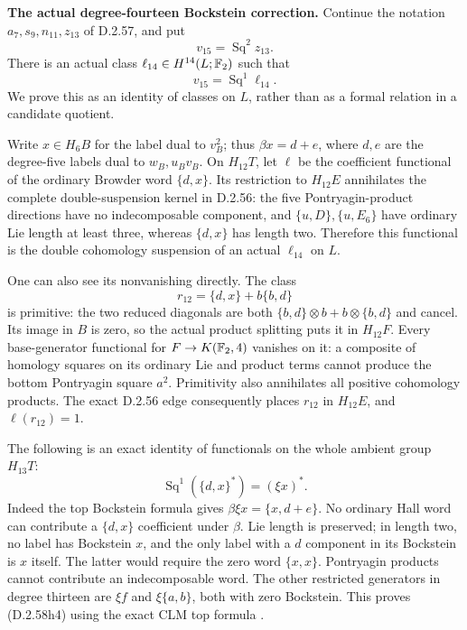 \textbf{The actual degree-fourteen Bockstein correction.}
Continue the notation $a_7,s_9,n_{11},z_{13}$ of D.2.57, and put
\[
 v_{15}=\operatorname{Sq}^2z_{13}.
 \tag{D.2.58h1}
\]
There is an actual class $\ell_{14}\in H^{14}(L;\mathbb F_2)$ such that
\[
             v_{15}=\operatorname{Sq}^1\ell_{14}.
 \tag{D.2.58h2}
\]
We prove this as an identity of classes on $L$, rather than as a
formal relation in a candidate quotient.

Write $x\in H_6B$ for the label dual to $v_B^2$; thus
$\beta x=d+e$, where $d,e$ are the degree-five labels dual to
$w_B,u_Bv_B$. On $H_{12}T$, let $\ell$ be the coefficient functional
of the ordinary Browder word $\{d,x\}$. Its restriction to $H_{12}E$
annihilates the complete double-suspension kernel in D.2.56:
the five Pontryagin-product directions have no indecomposable
component, and $\{u,D\},\{u,E_6\}$ have ordinary Lie length at
least three, whereas $\{d,x\}$ has length two. Therefore this
functional is the double cohomology suspension of an actual
$\ell_{14}$ on $L$.

One can also see its nonvanishing directly. The class
\[
             r_{12}=\{d,x\}+b\{b,d\}
             \tag{D.2.58h3}
\]
is primitive: the two reduced diagonals are both
$\{b,d\}\otimes b+b\otimes\{b,d\}$ and cancel.
Its image in $B$ is zero, so the actual product splitting puts it
in $H_{12}F$. Every base-generator functional for
$F\to K(\mathbb F_2,4)$ vanishes on it: a composite of homology squares
on its ordinary Lie and product terms cannot produce the bottom
Pontryagin square $a^2$. Primitivity also annihilates all positive
cohomology products. The exact D.2.56 edge consequently places
$r_{12}$ in $H_{12}E$, and $\ell(r_{12})=1$.

The following is an exact identity of functionals on the whole
ambient group $H_{13}T$:
\[
       \operatorname{Sq}^1(\{d,x\}^{*})=(\xi x)^{*}.
       \tag{D.2.58h4}
\]
Indeed the top Bockstein formula gives
$\beta\xi x=\{x,d+e\}$. No ordinary Hall word can contribute a
$\{d,x\}$ coefficient under $\beta$. Lie length is preserved;
in length two, no label has Bockstein $x$, and the only label with
a $d$ component in its Bockstein is $x$ itself. The latter would
require the zero word $\{x,x\}$. Pontryagin products cannot
contribute an indecomposable word. The other restricted generators
in degree thirteen are $\xi f$ and $\xi\{a,b\}$, both with zero
Bockstein. This proves \textup{(D.2.58h4)} using the exact CLM top
formula \cite[Chapter III, Theorem 1.3(3), p.~218]
{I_CohenLadaMay1976}.

